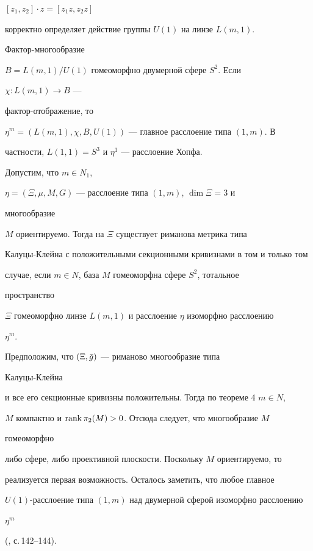 $[z_1,z_2]\cdot z=[z_1z,z_2z]$ 


корректно определяет действие группы $U(1)$ на линзе $L(m,1)$. 


Фактор-многообразие 


$B=L(m,1)/U(1)$ гомеоморфно двумерной сфере $S^2$. Если 


$\chi:L(m,1)\to B$ --- 


фактор-отображение, то 


$\eta^m=(L(m,1),\chi,B,U(1))$ --- главное расслоение типа $(1,m)$. В 


частности, $L(1,1)=S^3$ и $\eta^1$ --- расслоение Хопфа. 


 


\begin{thm} Допустим, что $m\in N_1$, 


$\eta=(\Xi,\mu,M,G)$ --- расслоение типа $(1,m)$, $\dim\Xi=3$ и 


многообразие 


$M$ ориентируемо. Тогда на $\Xi$ существует риманова метрика типа 


Калуцы-Клейна с положительными секционными кривизнами в том и только том 


случае, если $m\in N$, база $M$ гомеоморфна сфере $S^2$, тотальное 


пространство 


$\Xi$ гомеоморфно линзе $L(m,1)$ и расслоение $\eta$ изоморфно расслоению 


$\eta^m$. 


\end{thm} 


 


\begin{pf} Предположим, что $(\Xi,\Bar g)$ --- риманово многообразие типа 


Калуцы-Клейна 


и все его секционные кривизны положительны. Тогда по теореме 4 $m\in N$, 


$M$ компактно и $\operatorname{rank}\pi_2(M)>0$. Отсюда следует, что многообразие $M$ 


гомеоморфно 


либо сфере, либо проективной плоскости. Поскольку $M$ ориентируемо, то 


реализуется первая возможность. Осталось заметить, что любое главное 


$U(1)$-расслоение типа $(1,m)$ над двумерной сферой изоморфно расслоению 


$\eta^m$ 


(\cite{Hew}, с.\,142--144). 


\end{pf} 


